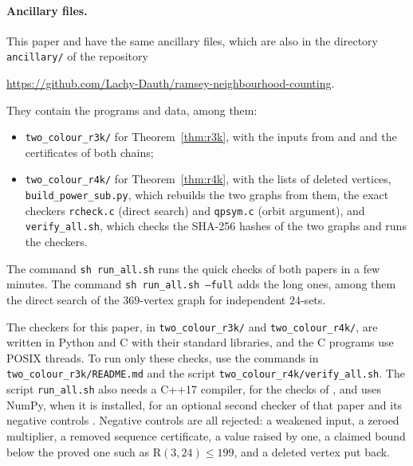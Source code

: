 \documentclass[11pt]{article}
\theoremstyle{spacedplain}
\theoremstyle{spaceddef}
\theoremstyle{spacedremark}
\newcommand{\R}{\mathrm{R}}
\begin{document}
\paragraph{Ancillary files.}
This paper and \cite{DC26} have the same ancillary files, which are also in the directory \texttt{ancillary/} of the repository
\begin{center}\url{https://github.com/Lachy-Dauth/ramsey-neighbourhood-counting}.\end{center}
They contain the programs and data, among them:
\begin{itemize}
\item \texttt{two\_colour\_r3k/} for Theorem~\ref{thm:r3k}, with the inputs from \cite{GR13} and \cite{Back3} and the certificates of both chains;
\item \texttt{two\_colour\_r4k/} for Theorem~\ref{thm:r4k}, with the lists of deleted vertices, \texttt{build\_power\_sub.py}, which rebuilds the two graphs from them, the exact checkers \texttt{rcheck.c} (direct search) and \texttt{qpsym.c} (orbit argument), and \texttt{verify\_all.sh}, which checks the SHA-256 hashes of the two graphs and runs the checkers.
\end{itemize}
The command \texttt{sh run\_all.sh} runs the quick checks of both papers in a few minutes.
The command \texttt{sh run\_all.sh --full} adds the long ones, among them the direct search of the $369$-vertex graph for independent $24$-sets.

The checkers for this paper, in \texttt{two\_colour\_r3k/} and \texttt{two\_colour\_r4k/}, are written in Python and C with their standard libraries, and the C programs use POSIX threads.
To run only these checks, use the commands in \texttt{two\_colour\_r3k/README.md} and the script \texttt{two\_colour\_r4k/verify\_all.sh}.
The script \texttt{run\_all.sh} also needs a C++17 compiler, for the checks of \cite{DC26}, and uses NumPy, when it is installed, for an optional second checker of that paper and its negative controls \cite[Section~10]{DC26}.
Negative controls are all rejected: a weakened input, a zeroed multiplier, a removed sequence certificate, a value raised by one, a claimed bound below the proved one such as $\R(3,24)\le 199$, and a deleted vertex put back.
\end{document}
